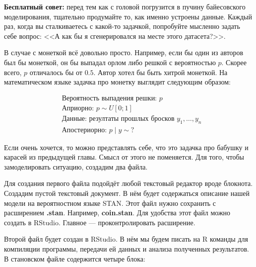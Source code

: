 \documentclass[12pt, a4paper, oneside]{extreport}
\theoremstyle{plain}              %
\theoremstyle{definition}         %
\begin{document}
\textbf{Бесплатный совет:} перед тем как с головой погрузится в пучину байесовского моделирования, тщательно продумайте то, как именно устроены данные. Каждый раз, когда вы сталкиваетесь с какой-то задачкой, попробуйте мысленно задать себе вопрос: <<А как бы я сгенерировался на месте этого датасета?>>. 

В случае с монеткой всё довольно просто.  Например, если бы один из авторов был бы монеткой, он бы выпадал орлом либо решкой с вероятностью $p$. Скорее всего, $p$ отличалось бы от $0.5$. Автор хотел бы быть хитрой монеткой.  На математическом языке задачка про монетку выглядит следующим образом: 
 
 \begin{equation*}
 \begin{aligned}
&\text{Вероятность выпадения решки: } p \\
&\text{Априорно: }  p \sim U[0;1] \\
&\text{Данные: резултаты прошлых бросков } y_1, \ldots, y_n \\
&\text{Апостериорно: } p \mid y \sim \text{?} 
\end{aligned}
\end{equation*}  

\vspace{0.3cm}
 
Если очень хочется, то можно представлять себе, что это задачка про бабушку и карасей из предыдущей главы. Смысл от этого не поменяется.  Для того, чтобы замоделировать ситуацию, создадим два файла. 
 
 Для создания первого файла подойдёт любой текстовый редактор вроде блокнота. Создадим пустой текстовый документ. В нём будет содержаться описание нашей модели на вероятностном языке STAN. Этот файл нужно сохранить с расширением \textbf{.stan}. Например, \textbf{coin.stan}.  Для удобства этот файл можно создать в RStudio. Главное ---  проконтролировать расширение. 
 
 Второй файл будет создан в RStudio.  В нём мы будем писать на R команды для компиляции программы, передачи ей данных и анализа полученных результатов.  В становском файле содержится четыре блока: 
 
\end{document}
